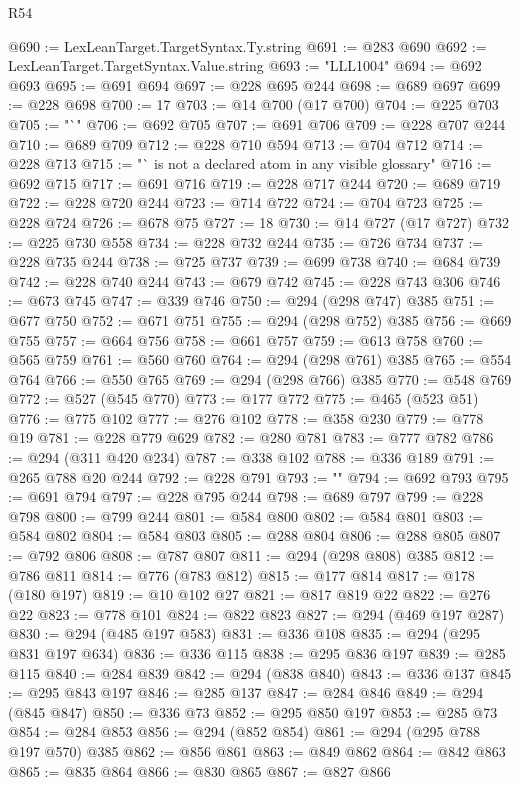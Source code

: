 \begin{lexlean}{R54}
\begin{coremodule}
@690 := LexLeanTarget.TargetSyntax.Ty.string
@691 := @283 @690
@692 := LexLeanTarget.TargetSyntax.Value.string
@693 := "LLL1004"
@694 := @692 @693
@695 := @691 @694
@697 := @228 @695 @244
@698 := @689 @697
@699 := @228 @698
@700 := 17
@703 := @14 @700 (@17 @700)
@704 := @225 @703
@705 := "`"
@706 := @692 @705
@707 := @691 @706
@709 := @228 @707 @244
@710 := @689 @709
@712 := @228 @710 @594
@713 := @704 @712
@714 := @228 @713
@715 := "` is not a declared atom in any visible glossary"
@716 := @692 @715
@717 := @691 @716
@719 := @228 @717 @244
@720 := @689 @719
@722 := @228 @720 @244
@723 := @714 @722
@724 := @704 @723
@725 := @228 @724
@726 := @678 @75
@727 := 18
@730 := @14 @727 (@17 @727)
@732 := @225 @730 @558
@734 := @228 @732 @244
@735 := @726 @734
@737 := @228 @735 @244
@738 := @725 @737
@739 := @699 @738
@740 := @684 @739
@742 := @228 @740 @244
@743 := @679 @742
@745 := @228 @743 @306
@746 := @673 @745
@747 := @339 @746
@750 := @294 (@298 @747) @385
@751 := @677 @750
@752 := @671 @751
@755 := @294 (@298 @752) @385
@756 := @669 @755
@757 := @664 @756
@758 := @661 @757
@759 := @613 @758
@760 := @565 @759
@761 := @560 @760
@764 := @294 (@298 @761) @385
@765 := @554 @764
@766 := @550 @765
@769 := @294 (@298 @766) @385
@770 := @548 @769
@772 := @527 (@545 @770)
@773 := @177 @772
@775 := @465 (@523 @51)
@776 := @775 @102
@777 := @276 @102
@778 := @358 @230
@779 := @778 @19
@781 := @228 @779 @629
@782 := @280 @781
@783 := @777 @782
@786 := @294 (@311 @420 @234)
@787 := @338 @102
@788 := @336 @189
@791 := @265 @788 @20 @244
@792 := @228 @791
@793 := ""
@794 := @692 @793
@795 := @691 @794
@797 := @228 @795 @244
@798 := @689 @797
@799 := @228 @798
@800 := @799 @244
@801 := @584 @800
@802 := @584 @801
@803 := @584 @802
@804 := @584 @803
@805 := @288 @804
@806 := @288 @805
@807 := @792 @806
@808 := @787 @807
@811 := @294 (@298 @808) @385
@812 := @786 @811
@814 := @776 (@783 @812)
@815 := @177 @814
@817 := @178 (@180 @197)
@819 := @10 @102 @27
@821 := @817 @819 @22
@822 := @276 @22
@823 := @778 @101
@824 := @822 @823
@827 := @294 (@469 @197 @287)
@830 := @294 (@485 @197 @583)
@831 := @336 @108
@835 := @294 (@295 @831 @197 @634)
@836 := @336 @115
@838 := @295 @836 @197
@839 := @285 @115
@840 := @284 @839
@842 := @294 (@838 @840)
@843 := @336 @137
@845 := @295 @843 @197
@846 := @285 @137
@847 := @284 @846
@849 := @294 (@845 @847)
@850 := @336 @73
@852 := @295 @850 @197
@853 := @285 @73
@854 := @284 @853
@856 := @294 (@852 @854)
@861 := @294 (@295 @788 @197 @570) @385
@862 := @856 @861
@863 := @849 @862
@864 := @842 @863
@865 := @835 @864
@866 := @830 @865
@867 := @827 @866

\end{coremodule}
\end{lexlean}
